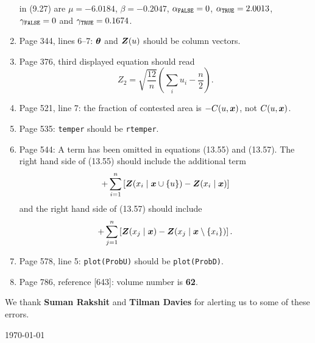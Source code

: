\documentclass[12pt,a4paper]{article}
\newcommand{\boldmaths}[1]{{\ensuremath\boldsymbol{#1}}}
\newcommand{\bx}{\boldmaths x}
\newcommand{\bZ}{\boldmaths Z}
\begin{document}
\begin{enumerate}
  in (9.27) are $\mu =-6.0184$, $\beta=-0.2047$,
  $\alpha_{\mbox{\scriptsize \texttt{FALSE}}} = 0$,
  $\alpha_{\mbox{\scriptsize \texttt{TRUE}}} = 2.0013$,
  $\gamma_{\mbox{\scriptsize \texttt{FALSE}}} = 0$ and
  $\gamma_{\mbox{\scriptsize \texttt{TRUE}}} = 0.1674$.
\item Page 344, lines 6--7: $\boldmaths\theta$ and $\bZ(u)$ 
should be column vectors.
\item Page 376, third displayed equation should read
  \[
       Z_2 = \sqrt{\frac{12}{n}} (\sum_i u_i - \frac n 2).
  \]
\item Page 521, line 7: the fraction of contested area is $-C(u, \bx)$,
not $C(u,\bx)$.
\item Page 535: \texttt{temper} should be \texttt{rtemper}.
\item Page 544: A term has been omitted in equations (13.55) and (13.57).
The right hand side of (13.55) should include the additional term
\[
   + \sum_{i=1}^n \left[ \bZ(x_i \mid \bx \cup \{u\}) - \bZ(x_i \mid \bx) \right]
\]
and the right hand side of (13.57) should include
\[
  + \sum_{j=1}^n \left[ \bZ(x_j \mid \bx) - \bZ(x_j \mid \bx \setminus \{x_i\}) \right].
\]
\item Page 578, line 5: \texttt{plot(ProbU)} should be \texttt{plot(ProbD)}.
\item Page 786, reference [643]: volume number is \textbf{62}.
\end{enumerate}

We thank \textbf{Suman Rakshit} and \textbf{Tilman Davies}
for alerting us to some of these errors.\\

\vspace*{\fill}


\hspace*{\fill} \today
\end{document}
